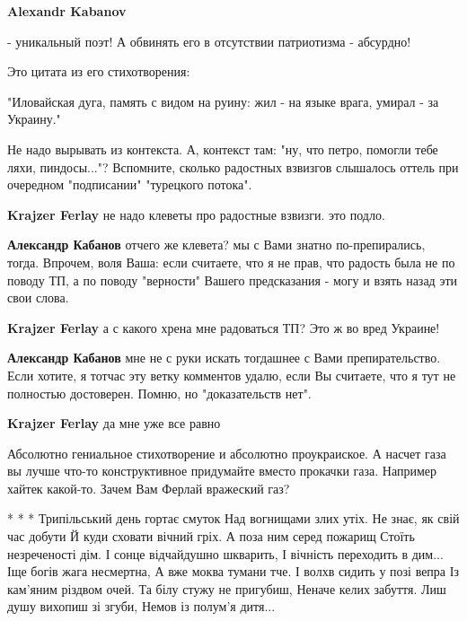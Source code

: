 \begin{itemize}
\begin{itemize}
\end{itemize} %

\textbf{Alexandr Kabanov} 

- уникальный поэт! А обвинять его в отсутствии патриотизма - абсурдно!

Это цитата из его стихотворения:

\obeycr
"Иловайская дуга,
память с видом на руину:
жил - на языке врага,
умирал - за Украину."
\restorecr

\begin{itemize} %

Не надо вырывать из контекста. А, контекст там: "ну, что петро, помогли тебе
ляхи, пиндосы..."? Вспомните, сколько радостных взвизгов слышалось оттель при
очередном "подписании" "турецкого потока".



\textbf{Krajzer Ferlay} не надо клеветы про радостные взвизги. это подло.

\textbf{Александр Кабанов} отчего же клевета? мы с Вами знатно по-препирались, тогда. Впрочем, воля Ваша: если считаете, что я не прав, что радость была не по поводу ТП, а по поводу "верности" Вашего предсказания - могу и взять назад эти свои слова.


\textbf{Krajzer Ferlay} а с какого хрена мне радоваться ТП? Это ж во вред Украине!

\textbf{Александр Кабанов} мне не с руки искать тогдашнее с Вами препирательство. Если хотите, я тотчас эту ветку комментов удалю, если Вы считаете, что я тут не полностью достоверен. Помню, но "доказательств нет".


\textbf{Krajzer Ferlay} да мне уже все равно


Абсолютно гениальное стихотворение и абсолютно проукраиское. А насчет газа вы
лучше что-то конструктивное придумайте вместо прокачки газа. Например хайтек
какой-то. Зачем Вам Ферлай вражеский газ?

\end{itemize} %

* * *
\obeycr
Трипільський день гортає смуток
Над вогнищами злих утіх.
Не знає, як свій час добути
Й куди сховати вічний гріх.
А поза ним серед пожарищ
Стоїть незреченості дім.
І сонце відчайдушно шкварить,
І вічність переходить в дим...
Іще богів жага несмертна,
А вже моква тумани тче.
І волхв сидить у позі вепра
Із кам’яним різдвом очей.
Та білу стужу не пригубиш,
Неначе келих забуття.
Лиш душу вихопиш зі згуби,
Немов із полум’я дитя...
\restorecr



\end{itemize}
